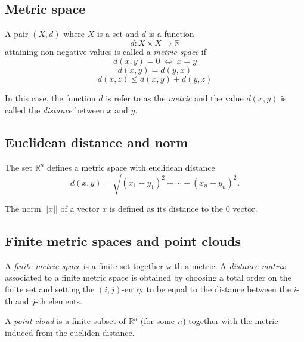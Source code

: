 \documentclass{amsart}
\begin{document}
	\subsection*{Metric space} \label{metric space}
	
	A pair $(X, d)$ where $X$ is a set and $d$ is a function 
	\begin{equation*}
	d : X \times X \to \mathbb R
	\end{equation*}
	attaining non-negative values is called a \textit{metric space} if
	\begin{equation*}
	d(x,y) = 0\ \Leftrightarrow\ x = y
	\end{equation*}
	\begin{equation*}
	d(x,y) = d(y,x)
	\end{equation*}
	\begin{equation*}
	d(x,z) \leq d(x,y) + d(y, z)
	\end{equation*}
	
	In this case, the function $d$ is refer to as the \textit{metric} and the value $d(x,y)$ is called the \textit{distance} between $x$ and $y$. 
	
	\subsection*{Euclidean distance and norm} \label{euclidean distance and norm}
	
	The set $\mathbb R^n$ defines a metric space with euclidean distance
	\begin{equation*}
	d(x,y) = \sqrt{(x_1-y_1)^2 + \cdots + (x_n-y_n)^2}.
	\end{equation*}
	
	The norm $||x||$ of a vector $x$ is defined as its distance to the $0$ vector.
	
	\subsection*{Finite metric spaces and point clouds} \label{finite metric spaces and point clouds}
	
	A \textit{finite metric space} is a finite set together with a \hyperref[metric space]{metric}. A \textit{distance matrix} associated to a finite metric space is obtained by choosing a total order on the finite set and setting the $(i,j)$-entry to be equal to the distance between the $i$-th and $j$-th elements. 
	
	A \textit{point cloud} is a finite subset of $\mathbb{R}^n$ (for some $n$) together with the metric induced from the \hyperref[euclidean distance and norm]{eucliden distance}.
	
\end{document}
